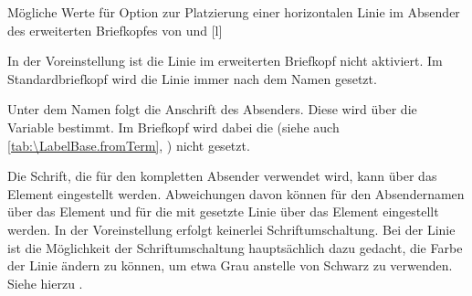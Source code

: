 \begin{table}
  \setcapindent{0pt}%
  \begin{captionbeside}
    {%
      \label{tab:\LabelBase.fromrule}%
      Mögliche Werte für Option  zur
      Platzierung einer horizontalen Linie im Absender des erweiterten
      Briefkopfes von  und %
    }%
    [l]%
    \begin{minipage}[t]{.6\linewidth}%
      \begin{desctabular}[t]
      \end{desctabular}
    \end{minipage}
  \end{captionbeside}
\end{table}

In der Voreinstellung ist die Linie im erweiterten
Briefkopf nicht aktiviert. Im Standardbriefkopf wird die Linie immer nach dem
Namen gesetzt.

Unter dem Namen folgt die Anschrift des
Absenders. Diese wird über die Variable  bestimmt. Im
Briefkopf wird dabei die  (siehe auch
\autoref{tab:\LabelBase.fromTerm}, ) nicht
gesetzt.

\BeginIndexGroup
{}%
%
%
Die Schrift, die für den kompletten Absender verwendet wird, kann über das
Element %
 eingestellt werden. Abweichungen davon
können für den Absendernamen über das Element
%
 und für die mit  gesetzte
Linie über das Element %
 eingestellt werden. In der Voreinstellung
erfolgt keinerlei Schriftumschaltung. Bei der Linie ist die Möglichkeit der
Schriftumschaltung hauptsächlich dazu gedacht, die Farbe der Linie ändern zu
können, um etwa Grau anstelle von Schwarz zu verwenden. Siehe hierzu
\cite{package:xcolor}.%
%
\EndIndexGroup

